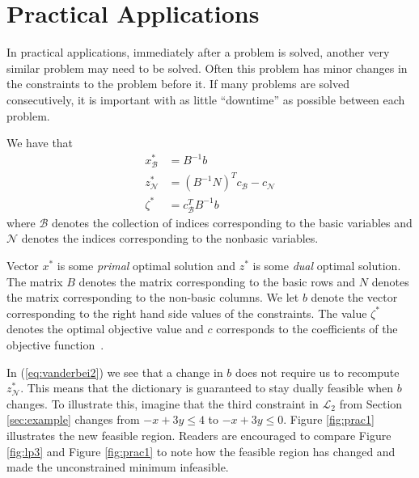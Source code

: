\section{Practical Applications}
In practical applications, immediately after a problem is solved, another very
similar problem may need to be solved.
Often this problem has minor changes in the constraints to the problem before
it.
If many problems are solved consecutively, it is important with as little
``downtime'' as possible between each problem.

We have that
\begin{align}
    x_{\mathcal{B}}^* &= B^{-1}b \label{eq:vanderbei1} \\
    z_{\mathcal{N}}^* &= (B^{-1}N)^Tc_{\mathcal{B}}-c_{\mathcal{N}}
                                                      \label{eq:vanderbei2} \\
    \zeta^* &= c_{\mathcal{B}}^TB^{-1}b \label{eq:vanderbei3}
\end{align}
where $\mathcal{B}$ denotes the collection of indices corresponding to the
basic variables and $\mathcal{N}$ denotes the indices corresponding to the
nonbasic variables.

Vector $x^*$ is some \emph{primal} optimal solution and $z^*$ is some
\emph{dual} optimal solution.
The matrix $B$ denotes the matrix corresponding to the basic rows and $N$
denotes the matrix corresponding to the non-basic columns.
We let $b$ denote the vector corresponding to the right hand side values of the
constraints.
The value $\zeta^*$ denotes the optimal objective value and $c$ corresponds to
the coefficients of the objective function~\cite{vanderbei}.

In (\ref{eq:vanderbei2}) we see that a change in $b$ does not require us to
recompute $z_{\mathcal{N}}^*$.
This means that the dictionary is guaranteed to stay dually feasible when $b$
changes.
To illustrate this, imagine that the third constraint in $\mathcal{L}_2$ from Section \ref{sec:example} changes from $-x + 3y \leq 4$ to
$-x + 3y \leq 0$. Figure \ref{fig:prac1} illustrates the new feasible region.
Readers are encouraged to compare Figure \ref{fig:lp3} and Figure
\ref{fig:prac1} to note how the feasible region has changed and made the
unconstrained minimum infeasible.

